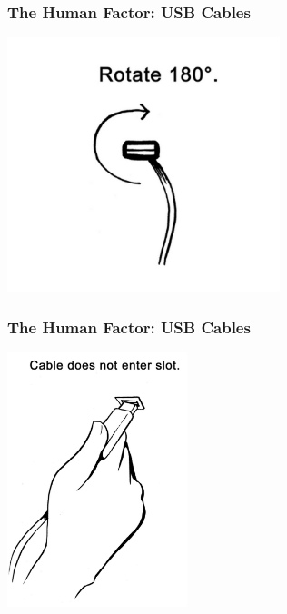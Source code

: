 \begin{frame}
\frametitle{The Human Factor: USB Cables}
\begin{changemargin}{1cm}

\vspace{-0.5em}
\begin{center}
	\includegraphics[height=20em]{images/usb2.png}\\
\end{center}

\end{changemargin}
\end{frame}


\begin{frame}
\frametitle{The Human Factor: USB Cables}
\begin{changemargin}{1cm}

\vspace{-0.5em}
\begin{center}
	\includegraphics[height=20em]{images/usb3.png}\\
\end{center}

\end{changemargin}
\end{frame}


